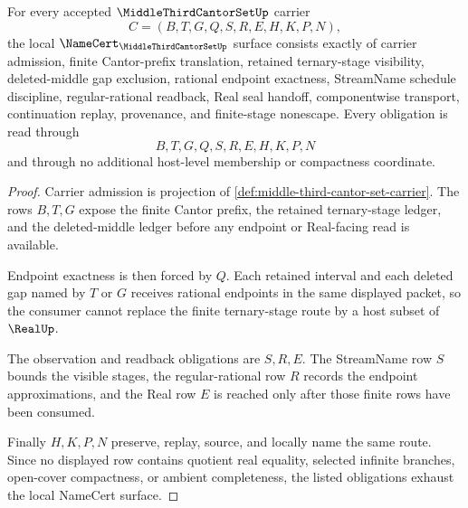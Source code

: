 \begin{theorem}
\label{thm:middle-third-cantor-set-namecert-obligations}
For every accepted $\MiddleThirdCantorSetUp$ carrier
$$
C=(B,T,G,Q,S,R,E,H,K,P,N),
$$
the local $\NameCert_{\MiddleThirdCantorSetUp}$ surface consists exactly of carrier admission, finite Cantor-prefix translation, retained ternary-stage visibility, deleted-middle gap exclusion, rational endpoint exactness, StreamName schedule discipline, regular-rational readback, Real seal handoff, componentwise transport, continuation replay, provenance, and finite-stage nonescape. Every obligation is read through
$$
B,T,G,Q,S,R,E,H,K,P,N
$$
and through no additional host-level membership or compactness coordinate.
\end{theorem}
\begin{proof}
Carrier admission is projection of \autoref{def:middle-third-cantor-set-carrier}. The rows $B,T,G$ expose the finite Cantor prefix, the retained ternary-stage ledger, and the deleted-middle ledger before any endpoint or Real-facing read is available.

Endpoint exactness is then forced by $Q$. Each retained interval and each deleted gap named by $T$ or $G$ receives rational endpoints in the same displayed packet, so the consumer cannot replace the finite ternary-stage route by a host subset of $\RealUp$.

The observation and readback obligations are $S,R,E$. The StreamName row $S$ bounds the visible stages, the regular-rational row $R$ records the endpoint approximations, and the Real row $E$ is reached only after those finite rows have been consumed.

Finally $H,K,P,N$ preserve, replay, source, and locally name the same route. Since no displayed row contains quotient real equality, selected infinite branches, open-cover compactness, or ambient completeness, the listed obligations exhaust the local NameCert surface.
\end{proof}

